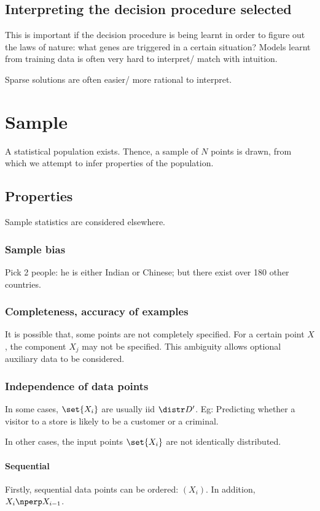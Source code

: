 \documentclass[oneside, article]{memoir}
\begin{document}
\section{Interpreting the decision procedure selected}
This is important if the decision procedure is being learnt in order to figure out the laws of nature: what genes are triggered in a certain situation? Models learnt from training data is often very hard to interpret/ match with intuition.

Sparse solutions are often easier/ more rational to interpret.

\chapter{Sample}
A statistical population exists. Thence, a sample of $N$ points is drawn, from which we attempt to infer properties of the population.

\section{Properties}
Sample statistics are considered elsewhere.

\subsection{Sample bias}
Pick 2 people: he is either Indian or Chinese; but there exist over 180 other countries.

\subsection{Completeness, accuracy of examples}
It is possible that, some points are not completely specified. For a certain point $X$, the component $X_j$ may not be specified. This ambiguity allows optional auxiliary data to be considered.

\subsection{Independence of data points}
In some cases, $\set{X_{i}}$ are usually iid $\distr D'$.  Eg: Predicting whether a visitor to a store is likely to be a customer or a criminal.

In other cases, the input points $\set{X_i}$ are not identically distributed.

\subsubsection{Sequential}
Firstly, sequential data points can be ordered: $(X_i)$. In addition, $X_i \nperp X_{i-1}$.
\end{document}
